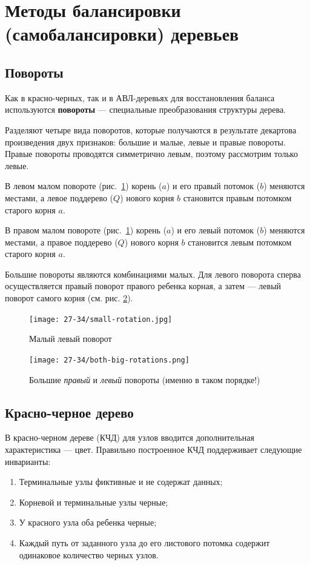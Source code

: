\section{Методы балансировки (самобалансировки) деревьев}
\subsection{Повороты}
\label{sec:rotations}
Как в красно-черных, так и в АВЛ-деревьях для восстановления баланса используются
\textbf{повороты} --- специальные преобразования структуры дерева.

Разделяют четыре вида поворотов, которые получаются в результате декартова произведения двух признаков:
большие и малые, левые и правые повороты. Правые повороты проводятся симметрично левым, поэтому рассмотрим
только левые.

В левом малом повороте (рис.~\ref{fig:small-rotation}) корень ($a$) и его правый потомок ($b$)
меняются местами, а левое поддерево ($Q$) нового корня $b$ становится правым потомком старого корня $a$.

В правом малом повороте (рис.~\ref{fig:small-rotation}) корень ($a$) и его левый потомок ($b$)
меняются местами, а правое поддерево ($Q$) нового корня $b$ становится левым потомком старого корня $a$.

Большие повороты являются комбинациями малых. Для левого поворота сперва осуществляется правый поворот
правого ребенка корная, а затем --- левый поворот самого корня (см. рис. \ref{fig:big-rotation}).

\begin{figure}
  \begin{center}
  \texttt{[image: 27-34/small-rotation.jpg]}
  \caption{Малый левый поворот}
  \label{fig:small-rotation}
  \end{center}
\end{figure}
\begin{figure}
  \begin{center}
  \texttt{[image: 27-34/both-big-rotations.png]}
  \caption{Большие \textit{правый} и \textit{левый} повороты (именно в таком порядке!)}
  \label{fig:big-rotation}
  \end{center}
\end{figure}

\subsection{Красно-черное дерево}
В красно-черном дереве (КЧД) для узлов вводится дополнительная характеристика --- цвет.
Правильно построенное КЧД поддерживает следующие инварианты:
\begin{enumerate}
  \item Терминальные узлы фиктивные и не содержат данных;
  \item Корневой и терминальные узлы черные;
  \item У красного узла оба ребенка черные;
  \item Каждый путь от заданного узла до его листового потомка содержит одинаковое количество черных узлов.
\end{enumerate}

